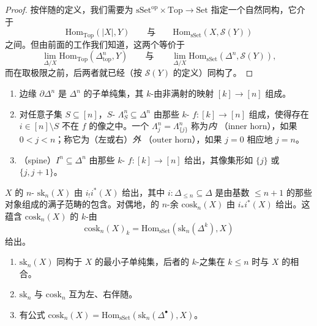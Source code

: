 \begin{proof}
按伴随的定义，我们需要为\trFunctor{} $\mathrm{sSet}^{\mathrm{op}} \times \mathrm{Top} \to \mathrm{Set}$
指定一个自然同构，它介于
\[
\mathrm{Hom}_{\mathrm{Top}}(|X|, Y)
\qquad\text{与}\qquad
\mathrm{Hom}_{\mathrm{sSet}}(X, \mathcal{S}(Y))
\]
之间。但由前面的工作我们知道，这两个\trFunctor{}等价于
\[
\operatorname*{lim}_{\Delta/X} \mathrm{Hom}_{\mathrm{Top}}(\Delta^n_{\mathrm{top}},
Y)
\qquad\text{与}\qquad
\operatorname*{lim}_{\Delta/X} \mathrm{Hom}_{\mathrm{sSet}}(\Delta^n,
\mathcal{S}(Y)),
\]
而在取极限之前，后两者就已经（按 $\mathcal{S}(Y)$ 的定义）同构了。
\end{proof}
\begin{definition}\label{def:boundary-horn-spine}
\begin{enumerate}[label=(\arabic*)]
  \item 边缘 $\partial\Delta^n$ 是 $\Delta^n$ 的子单纯集，其 $k$-\trSimplex{}由非满射的映射
  $[k] \to [n]$ 组成。
  \item 对任意子集 $S \subseteq [n]$，$S$-\trHorn{} $\Lambda^n_S \subseteq \Delta^n$
  由那些 $k$-\trSimplex{} $f\colon [k] \to [n]$ 组成，使得存在 $i \in [n] \setminus S$ 不在
  $f$ 的像之中。一个\trHorn{} $\Lambda^n_j = \Lambda^n_{\{j\}}$ 称为\emph{内%
  \trHorn{}}（inner horn），如果 $0 < j < n$；称它为（左或右）\emph{外\trHorn{}}
  （outer horn），如果 $j = 0$ 相应地 $j = n$。
  \item \emph{\trSpine{}}（spine）$I^n \subseteq \Delta^n$ 由那些 $k$-\trSimplex{}%
  $f\colon [k] \to [n]$ 给出，其像集形如 $\{j\}$ 或 $\{j, j+1\}$。
\end{enumerate}
\end{definition}

\begin{definition}\label{def:skeleton-coskeleton}
\trSimplicialSet{} $X$ 的 $n$-\trSkeleton{} $\mathrm{sk}_n(X)$ 由\trSimplicialSet{}%
$i_!i^*(X)$ 给出，其中 $i\colon \Delta_{\le n} \subseteq \Delta$ 是由基数 $\le n+1$
的那些对象组成的满子范畴的包含。对偶地，\trSimplicialSet{}的 $n$-余\trSkeleton{}%
$\mathrm{cosk}_n(X)$ 由\trSimplicialSet{} $i_*i^*(X)$ 给出。这蕴含
$\mathrm{cosk}_n(X)$ 的 $k$-\trSimplex{}由
\[
\mathrm{cosk}_n(X)_k = \mathrm{Hom}_{\mathrm{sSet}}(\mathrm{sk}_n(\Delta^k), X)
\]
给出。
\end{definition}

\begin{lemma}\label{lem:skeleton-coskeleton-adjoint}
\begin{enumerate}[label=(\arabic*)]
  \item \trSkeleton{} $\mathrm{sk}_n(X)$ 同构于 $X$ 的最小子单纯集，后者的 $k$-\trSimplex{}之集在
  $k \le n$ 时与 $X$ 的相合。
  \item \trFunctor{} $\mathrm{sk}_n$ 与 $\mathrm{cosk}_n$ 互为左、右伴随。
  \item 有公式 $\mathrm{cosk}_n(X) = \mathrm{Hom}_{\mathrm{sSet}}(\mathrm{sk}_n(\Delta^{\bullet}), X)$。
\end{enumerate}
\end{lemma}

